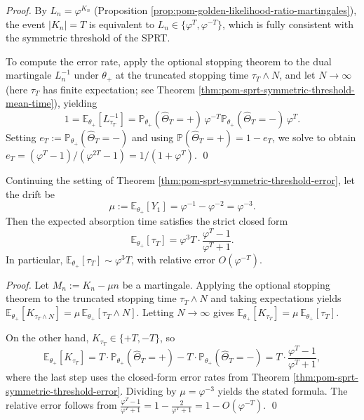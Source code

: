 \begin{proof}
By \(L_n=\varphi^{K_n}\) (Proposition \ref{prop:pom-golden-likelihood-ratio-martingales}), the event \(|K_n|=T\) is equivalent to \(L_n\in\{\varphi^{T},\varphi^{-T}\}\), which is fully consistent with the symmetric threshold of the SPRT.
\par
To compute the error rate, apply the optional stopping theorem to the dual martingale \(L_n^{-1}\) under \(\theta_+\) at the truncated stopping time \(\tau_T\wedge N\), and let \(N\to\infty\) (here \(\tau_T\) has finite expectation; see Theorem \ref{thm:pom-sprt-symmetric-threshold-mean-time}), yielding
\[
1=\mathbb{E}_{\theta_+}[L_{\tau_T}^{-1}]
=\mathbb{P}_{\theta_+}(\widehat\Theta_T=+)\,\varphi^{-T}
\mathbb{P}_{\theta_+}(\widehat\Theta_T=-)\,\varphi^{T}.
\]
Setting \(e_T:=\mathbb{P}_{\theta_+}(\widehat\Theta_T=-)\) and using \(\mathbb{P}(\widehat\Theta_T=+)=1-e_T\), we solve to obtain
\(
e_T=(\varphi^{T}-1)/(\varphi^{2T}-1)=1/(1+\varphi^{T})
\).
\qed
\end{proof}

\begin{theorem}\label{thm:pom-sprt-symmetric-threshold-mean-time}
Continuing the setting of Theorem \ref{thm:pom-sprt-symmetric-threshold-error}, let the drift be
\[
\mu:=\mathbb{E}_{\theta_+}[Y_1]=\varphi^{-1}-\varphi^{-2}=\varphi^{-3}.
\]
Then the expected absorption time satisfies the strict closed form
\[
\boxed{\;
\mathbb{E}_{\theta_+}[\tau_T]
=\varphi^{3}T\cdot\frac{\varphi^{T}-1}{\varphi^{T}+1}.\;}
\]
In particular, \(\mathbb{E}_{\theta_+}[\tau_T]\sim \varphi^{3}T\), with relative error \(O(\varphi^{-T})\).
\end{theorem}

\begin{proof}
Let \(M_n:=K_n-\mu n\) be a martingale. Applying the optional stopping theorem to the truncated stopping time \(\tau_T\wedge N\) and taking expectations yields
\(
\mathbb{E}_{\theta_+}[K_{\tau_T\wedge N}]=\mu\,\mathbb{E}_{\theta_+}[\tau_T\wedge N]
\).
Letting \(N\to\infty\) gives \(\mathbb{E}_{\theta_+}[K_{\tau_T}]=\mu\,\mathbb{E}_{\theta_+}[\tau_T]\).
\par
On the other hand, \(K_{\tau_T}\in\{+T,-T\}\), so
\[
\mathbb{E}_{\theta_+}[K_{\tau_T}]
=T\cdot\mathbb{P}_{\theta_+}(\widehat\Theta_T=+)-T\cdot\mathbb{P}_{\theta_+}(\widehat\Theta_T=-)
=T\cdot\frac{\varphi^{T}-1}{\varphi^{T}+1},
\]
where the last step uses the closed-form error rates from Theorem \ref{thm:pom-sprt-symmetric-threshold-error}.
Dividing by \(\mu=\varphi^{-3}\) yields the stated formula.
The relative error follows from \(\frac{\varphi^T-1}{\varphi^T+1}=1-\frac{2}{\varphi^T+1}=1-O(\varphi^{-T})\). \qed
\end{proof}

